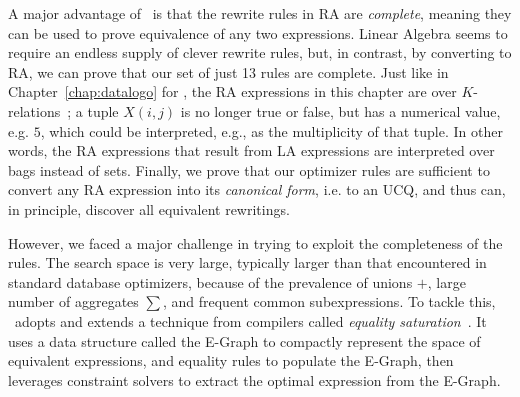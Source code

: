 A major advantage of \sys\ is that the rewrite rules in RA are
{\em complete}, meaning they can be used to prove equivalence of 
 any two expressions. Linear Algebra seems to require an endless supply of clever
rewrite rules, but, in contrast, by converting to RA, we can prove
that our set of just 13 rules are complete. 
Just like in Chapter~\ref{chap:datalogo} for \datalogo,
the RA expressions in this chapter are
over $K$-relations~\cite{DBLP:conf/pods/GreenKT07}; a tuple $X(i,j)$
is no longer true or false, but has a numerical value, e.g. $5$,
%
which could be interpreted, e.g., as the multiplicity of that tuple.
%
In other words, the RA expressions that result from LA expressions are
interpreted over bags instead of sets. 
Finally, we prove that our optimizer rules are
sufficient to convert any RA expression into its {\em canonical form},
i.e.  to an UCQ, and thus can, in principle, discover all equivalent
rewritings.

However, we faced a major challenge in trying to exploit the
completeness of the rules.  The search space is very large,
typically larger than that encountered in standard database
optimizers, because of the prevalence of unions $+$, large number of
aggregates $\sum$, and frequent common subexpressions. To tackle this,
\sys\ adopts and extends a technique from compilers called {\em
  equality saturation}~\cite{DBLP:journals/corr/abs-1012-1802}.
It uses a data structure called the E-Graph \cite{10.5555/909447} to
compactly represent the space of equivalent expressions, and equality
rules to populate the E-Graph, then leverages constraint solvers to
extract the optimal expression from the E-Graph.  

